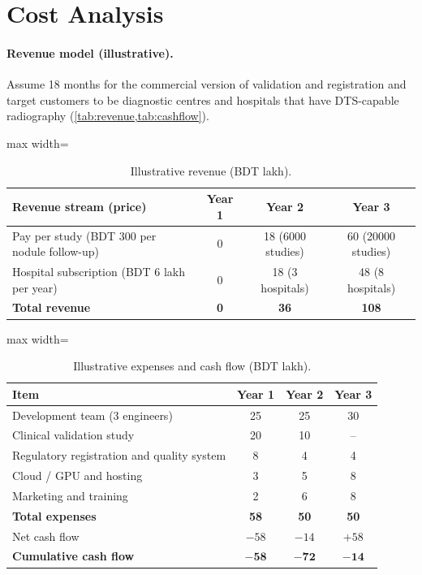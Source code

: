 \section{Cost Analysis}

\paragraph{Revenue model (illustrative).} Assume 18 months for the commercial version of validation and registration and target customers to be diagnostic centres and hospitals that have DTS-capable radiography (\cref{tab:revenue,tab:cashflow}).

\begin{table}[!htbp]
\centering\small
\caption{Illustrative revenue (BDT lakh).}
\label{tab:revenue}
\begin{adjustbox}{max width=\linewidth}
\begin{tabular}{lccc}
\toprule
Revenue stream (price) & Year 1 & Year 2 & Year 3 \\
\midrule
Pay per study (BDT 300 per nodule follow-up) & 0 & 18 (\num{6000} studies) & 60 (\num{20000} studies) \\
Hospital subscription (BDT 6 lakh per year) & 0 & 18 (3 hospitals) & 48 (8 hospitals) \\
\midrule
\textbf{Total revenue} & \textbf{0} & \textbf{36} & \textbf{108} \\
\bottomrule
\end{tabular}
\end{adjustbox}
\end{table}

\begin{table}[!htbp]
\centering\small
\caption{Illustrative expenses and cash flow (BDT lakh).}
\label{tab:cashflow}
\begin{adjustbox}{max width=\linewidth}
\begin{tabular}{lccc}
\toprule
Item & Year 1 & Year 2 & Year 3 \\
\midrule
Development team (3 engineers) & 25 & 25 & 30 \\
Clinical validation study & 20 & 10 & -- \\
Regulatory registration and quality system & 8 & 4 & 4 \\
Cloud / GPU and hosting & 3 & 5 & 8 \\
Marketing and training & 2 & 6 & 8 \\
\midrule
\textbf{Total expenses} & \textbf{58} & \textbf{50} & \textbf{50} \\
Net cash flow & $-58$ & $-14$ & $+58$ \\
\textbf{Cumulative cash flow} & $\mathbf{-58}$ & $\mathbf{-72}$ & $\mathbf{-14}$ \\
\bottomrule
\end{tabular}
\end{adjustbox}
\end{table}

